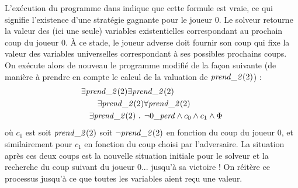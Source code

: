 
L'exécution du programme dans \touist indique que cette formule est vraie, ce qui signifie l'existence d'une stratégie gagnante pour le joueur $0$. Le solveur retourne la valeur des (ici une seule) variables existentielles correspondant au prochain coup du joueur $0$. À ce stade, le joueur adverse doit fournir son coup qui fixe la valeur des variables universelles correspondant à ses possibles prochains coups. On exécute alors de nouveau le programme modifié de la façon suivante (de manière à prendre en compte le calcul de la valuation de $\takes{0}$) :
\begin{align*}
\begin{split}
&\exists \takes{0}
\exists \takes{1}\\
&\qquad\exists \takes{2}
\forall \takes{3} \\
&\quad\exists \takes{4}\text{ . }\neg \lost \land c_0 \land c_1 \land  \Phi
\end{split}
\end{align*}
où $c_0$ est soit $\takes{0}$ soit $\neg \takes{0}$ en fonction du coup du joueur $0$, et similairement pour $c_1$ en fonction du coup choisi par l'adversaire. La  situation après ces deux coups est la nouvelle situation initiale pour le solveur et la recherche du coup suivant du joueur $0$... jusqu'à sa victoire ! On réitère ce processus jusqu'à ce que toutes les variables aient reçu une valeur. 

